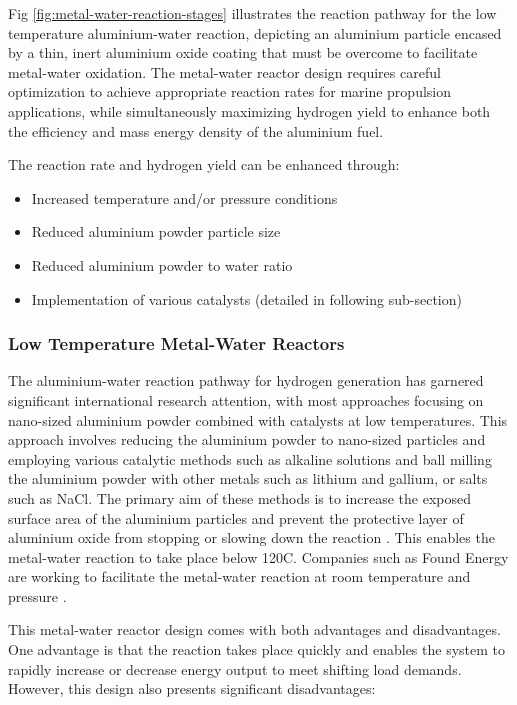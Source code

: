 \documentclass[12pt]{article}
\begin{document}
Fig \ref{fig:metal-water-reaction-stages} illustrates the reaction pathway for the low temperature aluminium-water reaction, depicting an aluminium particle encased by a thin, inert aluminium oxide coating that must be overcome to facilitate metal-water oxidation. The metal-water reactor design requires careful optimization to achieve appropriate reaction rates for marine propulsion applications, while simultaneously maximizing hydrogen yield to enhance both the efficiency and mass energy density of the aluminium fuel.

The reaction rate and hydrogen yield can be enhanced through:
\begin{itemize}
\item Increased temperature and/or pressure conditions
\item Reduced aluminium powder particle size
\item Reduced aluminium powder to water ratio
\item Implementation of various catalysts (detailed in following sub-section) \cite{energy-densitie-JMB, Al-steam, Al-water-reaction-pathways-review}
\end{itemize}

\break

\subsubsection{Low Temperature Metal-Water Reactors}

The aluminium-water reaction pathway for hydrogen generation has garnered significant international research attention, with most approaches focusing on nano-sized aluminium powder combined with catalysts at low temperatures. This approach involves reducing the aluminium powder to nano-sized particles and employing various catalytic methods such as alkaline solutions and ball milling the aluminium powder with other metals such as lithium and gallium, or salts such as NaCl. The primary aim of these methods is to increase the exposed surface area of the aluminium particles and prevent the protective layer of aluminium oxide from stopping or slowing down the reaction \cite{metal-water-temp-JMB, Al-water-reaction-pathways-review}. This enables the metal-water reaction to take place below 120\textdegree C. Companies such as Found Energy are working to facilitate the metal-water reaction at room temperature and pressure \cite{found-energy-website}.

This metal-water reactor design comes with both advantages and disadvantages. One advantage is that the reaction takes place quickly and enables the system to rapidly increase or decrease energy output to meet shifting load demands. However, this design also presents significant disadvantages:
\end{document}
